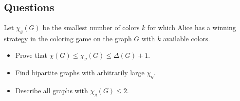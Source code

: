 \documentclass[a4paper]{article}
\begin{document}
\subsection*{Questions}
\medskip
Let $\chi_g(G)$ be the smallest number of colors $k$ for which Alice has a winning strategy in the coloring game on the graph $G$ with $k$ available colors.

\begin{itemize}
\item Prove that $\chi(G)\leq \chi_g(G)\leq \Delta(G)+1$.
\item Find bipartite graphs with arbitrarily large $\chi_g$.
\item Describe all graphs with $\chi_g(G)\leq 2$.
\end{itemize}
\end{document}
